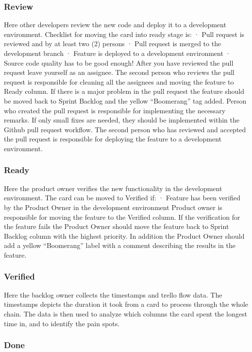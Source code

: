 \documentclass[english]{tktltiki2}
\theoremstyle{definition}
\theoremstyle{remark}
\begin{document}
\subsubsection{Review}
Here other developers review the new code and deploy it to a development environment. Checklist for moving the card into ready stage is:
·       Pull request is reviewed and by at least two (2) persons
·       Pull request is merged to the development branch
·       Feature is deployed to a development environment
·       Source code quality has to be good enough!
After you have reviewed the pull request leave yourself as an assignee. The second person who reviews the pull request is responsible for cleaning all the assignees and moving the feature to Ready column.
If there is a major problem in the pull request the feature should be moved back to Sprint Backlog and the yellow “Boomerang” tag added. Person who created the pull request is responsible for implementing the necessary remarks.
If only small fixes are needed, they should be implemented within the Github pull request workflow.
The second person who has reviewed and accepted the pull request is responsible for deploying the feature to a development environment.

\subsubsection{Ready}
Here the product owner verifies the new functionality in the development environment. The card can be moved to Verified if:
·       Feature has been verified by the Product Owner in the development environment
Product owner is responsible for moving the feature to the Verified column.
If the verification for the feature fails the Product Owner should move the feature back to Sprint Backlog column with the highest priority. In addition the Product Owner should add a yellow “Boomerang” label with a comment describing the results in the feature.

\subsubsection{Verified}
Here the backlog owner collects the timestamps and trello flow data. The timestamps depicts the duration it took from a card to process through the whole chain. The data is then used to analyze which columns the card spent the longest time in, and to identify the pain spots.
\subsubsection{Done}
\end{document}
